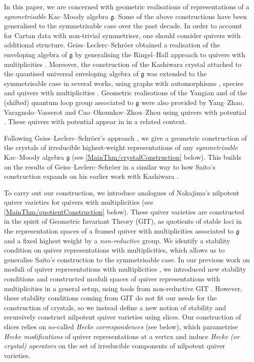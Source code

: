 \documentclass[a4paper,12pt]{article}
\theoremstyle{definition}
\theoremstyle{plain}
\theoremstyle{remark}
\begin{document}
In this paper, we are concerned with geometric realisations of representations of a \emph{symmetrisable} Kac--Moody algebra $\mathfrak{g}$.  Some of the above constructions have been generalised to the symmetrisable case over the past decade. In order to account for Cartan data with non-trivial symmetriser, one should consider quivers with additional structure. Geiss--Leclerc--Schr\"{o}er obtained a realisation of the enveloping algebra of $\mathfrak{g}$ by generalising the Ringel--Hall approach to quivers with multiplicities \cite{GLS16}. Moreover, the construction of the Kashiwara crystal attached to the quantised universal enveloping algebra of $\mathfrak{g}$ \cite{KS97} was extended to the symmetrisable case in several works, using graphs with automorphisms \cite{Sav05}, species \cite{NT18} and quivers with multiplicities \cite{GLS18a}. Geometric realisations of the Yangian and of the (shifted) quantum loop group associated to $\mathfrak{g}$ were also provided by Yang--Zhao, Varagnolo--Vasserot and Cao--Okounkov--Zhou--Zhou using quivers with potential \cite{YZ22,VV23b,COZZ26a}. These quivers with potential appear in \cite{HL16,Neg25b} in a related context.

Following Geiss--Leclerc--Schr\"{o}er's approach \cite{GLS18a}, we give a geometric construction of the crystals of irreducible highest-weight representations of any \emph{symmetrisable} Kac--Moody algebra $\mathfrak{g}$ (see \cref{MainThm/crystalConstruction} below). This builds on the results of Geiss--Leclerc--Schr\"{o}er \cite{GLS18a} in a similar way to how Saito's construction \cite{Sai02} expands on his earlier work with Kashiwara \cite{KS97}.

To carry out our construction, we introduce analogues of Nakajima's nilpotent quiver varieties \cite{Nak94} for quivers with multiplicities (see \cref{MainThm/quotientConstruction} below). These quiver varieties are constructed in the spirit of Geometric Invariant Theory (GIT), as quotients of stable loci in the representation spaces of a framed quiver with multiplicities associated to $\mathfrak{g}$ and a fixed highest weight by a \emph{non-reductive} group. We identify a stability condition on quiver representations with multiplicities, which allows us to generalise Saito's construction \cite{Sai02} to the symmetrisable case. In our previous work on moduli of quiver representations with multiplicities \cite{HJV25}, we introduced new stability conditions and constructed moduli spaces of quiver representations with multiplicities in a general setup, using tools from non-reductive GIT \cite{HHJ}. However, these stability conditions coming from GIT do not fit our needs for the construction of crystals, so we instead define a new notion of stability and recursively construct nilpotent quiver varieties using slices. Our construction of slices relies on so-called \emph{Hecke correspondences} (see below), which parametrise \emph{Hecke modifications} of quiver representations at a vertex and induce \emph{Hecke (or crystal) operators} on the set of irreducible components of nilpotent quiver varieties.
\end{document}
